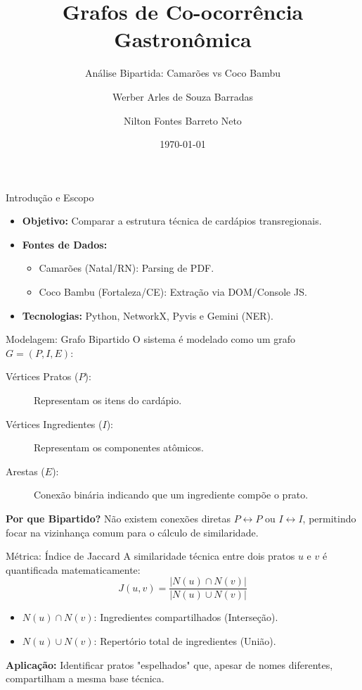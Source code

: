 \documentclass[10pt]{beamer}
\title{Grafos de Co-ocorrência Gastronômica}
\subtitle{Análise Bipartida: Camarões vs Coco Bambu}
\author{Werber Arles de Souza Barradas \and Nilton Fontes Barreto Neto}
\institute{DCA3304 - Estrutura de Dados II \\ Universidade Federal do Rio Grande do Norte (UFRN)}
\date{\today}
\begin{document}
\maketitle

\begin{frame}{Introdução e Escopo}
    \begin{itemize}
        \item \textbf{Objetivo:} Comparar a estrutura técnica de cardápios transregionais.
        \item \textbf{Fontes de Dados:}
            \begin{itemize}
                \item Camarões (Natal/RN): Parsing de PDF.
                \item Coco Bambu (Fortaleza/CE): Extração via DOM/Console JS.
            \end{itemize}
        \item \textbf{Tecnologias:} Python, NetworkX, Pyvis e Gemini (NER).
    \end{itemize}
\end{frame}

\begin{frame}{Modelagem: Grafo Bipartido}
    O sistema é modelado como um grafo $G = (P, I, E)$:
    \begin{description}
        \item[Vértices Pratos ($P$):] Representam os itens do cardápio.
        \item[Vértices Ingredientes ($I$):] Representam os componentes atômicos.
        \item[Arestas ($E$):] Conexão binária indicando que um ingrediente compõe o prato.
    \end{description}
    \vspace{0.5cm}
    \textbf{Por que Bipartido?} Não existem conexões diretas $P \leftrightarrow P$ ou $I \leftrightarrow I$, permitindo focar na vizinhança comum para o cálculo de similaridade.
\end{frame}

\begin{frame}{Métrica: Índice de Jaccard}
    A similaridade técnica entre dois pratos $u$ e $v$ é quantificada matematicamente:
    \[ J(u,v) = \frac{|N(u) \cap N(v)|}{|N(u) \cup N(v)|} \]
    \begin{itemize}
        \item $N(u) \cap N(v)$: Ingredientes compartilhados (Interseção).
        \item $N(u) \cup N(v)$: Repertório total de ingredientes (União).
    \end{itemize}
    \textbf{Aplicação:} Identificar pratos "espelhados" que, apesar de nomes diferentes, compartilham a mesma base técnica.
\end{frame}
\end{document}
